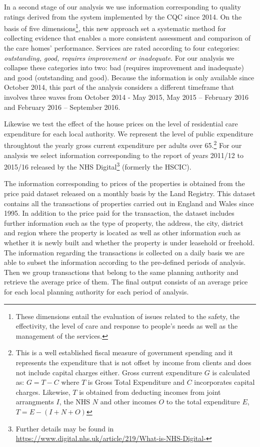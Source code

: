 \documentclass[12pt,letterpaper]{article}
\begin{document}
In a second stage of our analysis we use information
corresponding to quality ratings derived from the system
implemented by the CQC since 2014. On the basis of five 
dimensions\footnote{These dimensions entail the evaluation of issues related to the safety, the effectivity, 
the level of care and response to people’s needs as well as the management of the services.}, this new approach
  set a systematic method for collecting evidence that enables a more consistent assessment and comparison
   of the care homes’ performance. Services are rated according to four categories: {\it outstanding, good, requires
    improvement or inadequate}. For our analysis we collapse these categories into two: bad (requires improvement 
    and inadequate) and good (outstanding and good). Because the information is only available since October 2014, this part of the analysis considers a different
   timeframe that involves three waves from October 2014 - May 2015, May 2015 – February 2016 and 
   February 2016 – September 2016. 
   
   Likewise we test the effect of the house prices on the level of 
    residential care expenditure for each local authority. We represent the level
 of public expenditure throughtout the yearly gross current expenditure per adults over 65.\footnote{This is a well established fiscal measure of 
 government spending and it represents the expenditure that is not offset by income from clients and does not include capital charges either. Gross current expenditure $G$
  is calculated as: $G = T - C$ where $T$ is Gross Total Expenditure and $C$ incorporates capital charges. 
  Likewise, $T$ is obtained from deducting incomes from joint arrangments $I$, the NHS $N$ and other incomes $O$ to the total expenditure
   $E$, $T = E - (I+N+O)$} For our analysis we select 
  information corresponding  to the report of years 2011/12 to 2015/16 released by the NHS Digital\footnote{Further details
   may be found in \href{https://www.digital.nhs.uk/article/219/What-is-NHS-Digital-}{https://www.digital.nhs.uk/article/219/What-is-NHS-Digital-}} (formerly the HSCIC). 
   
    The information corresponding to prices of the properties is obtained from the price paid dataset
    released on a monthly basis by the Land Registry. This dataset contains all the transactions of
     properties carried out in England and Wales since 1995.  In addition to the price paid for the transaction,
    the dataset includes further information such as the type of property, the address, the city, district
     and region where the property is located as well as other information such as whether it is newly built
     and whether the property is under leasehold or freehold. The information regarding the transactions is
     collected on a daily basis we are able to subset the information according to the pre-defined periods of
     analysis. Then we group transactions that belong to the same planning authority and retrieve the average 
     price of them. The final output consists of an average price for each local planning authority for each
    period of analysis. 
        
\end{document}
